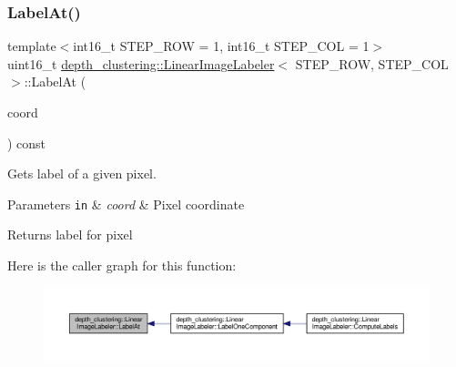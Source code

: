 \subsubsection{\texorpdfstring{Label\+At()}{LabelAt()}}
{\footnotesize\ttfamily template$<$int16\+\_\+t S\+T\+E\+P\+\_\+\+R\+OW = 1, int16\+\_\+t S\+T\+E\+P\+\_\+\+C\+OL = 1$>$ \\
uint16\+\_\+t \hyperlink{classdepth__clustering_1_1LinearImageLabeler}{depth\+\_\+clustering\+::\+Linear\+Image\+Labeler}$<$ S\+T\+E\+P\+\_\+\+R\+OW, S\+T\+E\+P\+\_\+\+C\+OL $>$\+::Label\+At (\begin{DoxyParamCaption}\item[{const \hyperlink{structdepth__clustering_1_1PixelCoord}{Pixel\+Coord} \&}]{coord }\end{DoxyParamCaption}) const\hspace{0.3cm}{\ttfamily [inline]}}



Gets label of a given pixel. 


\begin{DoxyParams}[1]{Parameters}
\mbox{\tt in}  & {\em coord} & Pixel coordinate\\
\hline
\end{DoxyParams}
\begin{DoxyReturn}{Returns}
label for pixel 
\end{DoxyReturn}
Here is the caller graph for this function\+:\nopagebreak
\begin{figure}[H]
\begin{center}
\leavevmode
\includegraphics[width=350pt]{classdepth__clustering_1_1LinearImageLabeler_a4389f0085999f71cc283d6c378a2536a_icgraph}
\end{center}
\end{figure}
\mbox{\label{classdepth__clustering_1_1LinearImageLabeler_ac5544f26628a05978a6a989ade6a1cd6}} 
